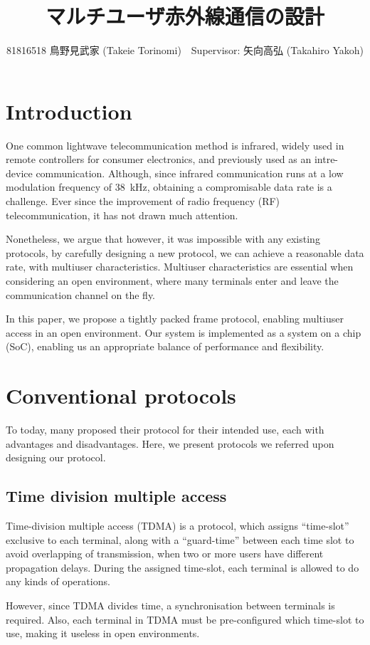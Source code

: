 ﻿\documentclass[twocolumn,9pt]{ltjsarticle}
\title{マルチユーザ赤外線通信の設計}
\author{81816518 鳥野見武家 (Takeie Torinomi)　Supervisor: 矢向高弘 (Takahiro Yakoh)}
\begin{document}
\maketitle
\section{Introduction}
One common lightwave telecommunication method is infrared, widely used in remote controllers for consumer electronics, and previously used as an intre-device communication.
Although, since infrared communication runs at a low modulation frequency of \SI{38}{kHz}, obtaining a compromisable data rate is a challenge. 
Ever since the improvement of radio frequency (RF) telecommunication, it has not drawn much attention.

Nonetheless, we argue that however, it was impossible with any existing protocols, by carefully designing a new protocol, we can achieve a reasonable data rate, with multiuser characteristics.
Multiuser characteristics are essential when considering an open environment, where many terminals enter and leave the communication channel on the fly.

In this paper, we propose a tightly packed frame protocol, enabling multiuser access in an open environment.
Our system is implemented as a system on a chip (SoC), enabling us an appropriate balance of performance and flexibility.

\section{Conventional protocols}
To today, many proposed their protocol for their intended use, each with advantages and disadvantages.
Here, we present protocols we referred upon designing our protocol.

\subsection{Time division multiple access}
Time-division multiple access (TDMA) is a protocol, which assigns ``time-slot'' exclusive to each terminal, along with a ``guard-time'' between each time slot to avoid overlapping of transmission, when two or more users have different propagation delays.
During the assigned time-slot, each terminal is allowed to do any kinds of operations.

However, since TDMA divides time, a synchronisation between terminals is required.
Also, each terminal in TDMA must be pre-configured which time-slot to use, making it useless in open environments.
\end{document}
